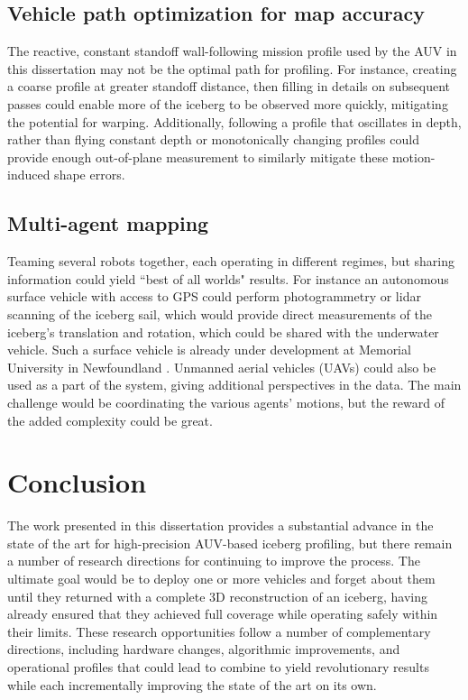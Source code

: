 \subsection{Vehicle path optimization for map accuracy}
The reactive, constant standoff wall-following mission profile used by the AUV in this dissertation may not be the optimal path for profiling. For instance, creating a coarse profile at greater standoff distance, then filling in details on subsequent passes could enable more of the iceberg to be observed more quickly, mitigating the potential for warping. Additionally, following a profile that oscillates in depth, rather than flying constant depth or monotonically changing profiles could provide enough out-of-plane measurement to similarly mitigate these motion-induced shape errors. 

\subsection{Multi-agent mapping}
Teaming several robots together, each operating in different regimes, but sharing information could yield ``best of all worlds" results. For instance an autonomous surface vehicle with access to GPS could perform photogrammetry or lidar scanning of the iceberg sail, which would provide direct measurements of the iceberg's translation and rotation, which could be shared with the underwater vehicle. Such a surface vehicle is already under development at Memorial University in Newfoundland \cite{Smith2014}. Unmanned aerial vehicles (UAVs) could also be used as a part of the system, giving additional perspectives in the data. The main challenge would be coordinating the various agents' motions, but the reward of the added complexity could be great. 

\section{Conclusion}

The work presented in this dissertation provides a substantial advance in the state of the art for high-precision AUV-based iceberg profiling, but there remain a number of research directions for continuing to improve the process. The ultimate goal would be to deploy one or more vehicles and forget about them until they returned with a complete 3D reconstruction of an iceberg, having already ensured that they achieved full coverage while operating safely within their limits. These research opportunities follow a number of complementary directions, including hardware changes, algorithmic improvements, and operational profiles that could lead to combine to yield revolutionary results while each incrementally improving the state of the art on its own. 